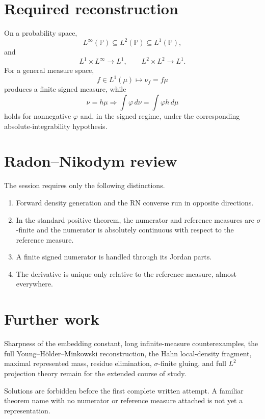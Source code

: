 \section*{Required reconstruction}

On a probability space,
\[
L^\infty(\mathbb P)
\subseteq
L^2(\mathbb P)
\subseteq
L^1(\mathbb P),
\]
and
\[
L^1\times L^\infty\longrightarrow L^1,
\qquad
L^2\times L^2\longrightarrow L^1.
\]
For a general measure space,
\[
f\in L^1(\mu)
\longmapsto
\nu_f=f\mu
\]
produces a finite signed measure, while
\[
\nu=h\mu
\Longrightarrow
\int \varphi\,d\nu=\int \varphi h\,d\mu
\]
holds for nonnegative $\varphi$ and, in the signed regime, under the corresponding absolute-integrability hypothesis.

\section*{Radon--Nikodym review}

The session requires only the following distinctions.
\begin{enumerate}
  \item Forward density generation and the RN converse run in opposite directions.
  \item In the standard positive theorem, the numerator and reference measures are $\sigma$-finite and the numerator is absolutely continuous with respect to the reference measure.
  \item A finite signed numerator is handled through its Jordan parts.
  \item The derivative is unique only relative to the reference measure, almost everywhere.
\end{enumerate}

\section*{Further work}

Sharpness of the embedding constant, long infinite-measure counterexamples, the full Young--Hölder--Minkowski reconstruction, the Hahn local-density fragment, maximal represented mass, residue elimination, $\sigma$-finite gluing, and full $L^2$ projection theory remain for the extended course of study.

Solutions are forbidden before the first complete written attempt. A familiar theorem name with no numerator or reference measure attached is not yet a representation.
